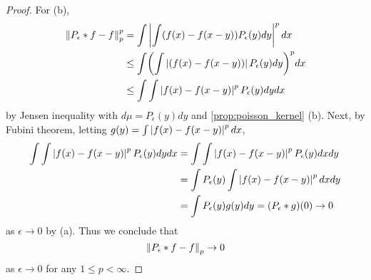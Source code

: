 \begin{proof}
    For (b), 
    \begin{equation*}
        \begin{split}
            \norm{P_\epsilon*f-f}_p^p &= \int\abs{\int (f(x)-f(x-y))P_\epsilon(y)dy}^pdx \\
            &\leq \int\pth{\int\abs{(f(x)-f(x-y))}P_\epsilon(y)dy}^pdx \\
            &\leq \int\int\abs{f(x)-f(x-y)}^p P_\epsilon(y)dydx \\
        \end{split}
    \end{equation*}
    by Jensen inequality with $d\mu = P_\epsilon(y)dy$ and \cref{prop:poisson_kernel} (b). 
    Next, by Fubini theorem, letting $g(y) = \int\left\lvert {f(x)-f(x-y)} \right\rvert^pdx$, 
    \begin{equation*}
        \begin{split}
            \int\int\left\lvert {f(x)-f(x-y)} \right\rvert^p P_\epsilon(y)dydx 
            &= \int\int\left\lvert {f(x)-f(x-y)} \right\rvert^p P_\epsilon(y)dxdy \\ 
            &= \int P_\epsilon(y)\int\left\lvert {f(x)-f(x-y)} \right\rvert^pdxdy \\
            &= \int P_\epsilon(y)g(y)dy = (P_\epsilon*g)(0)\to 0
        \end{split}
    \end{equation*}
    as $\epsilon\to 0$ by (a). Thus we conclude that 
    \begin{equation*}
        \left\lVert {P_\epsilon*f-f} \right\rVert_p \to 0
    \end{equation*}
    as $\epsilon\to 0$ for any $1\leq p<\infty$.
\end{proof}

